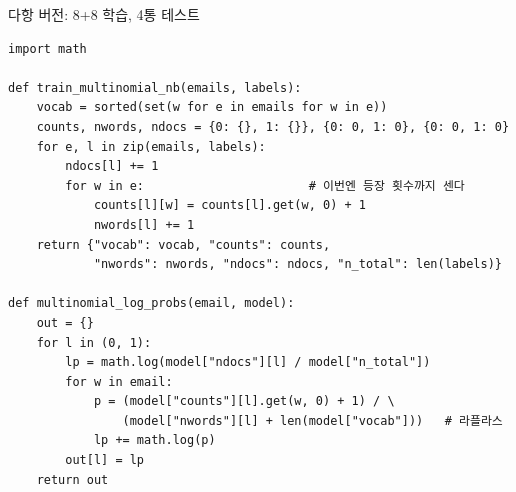 \begin{frame}[fragile,shrink=11]{다항 버전: 8+8 학습, 4통 테스트}
  \begin{lstlisting}
import math

def train_multinomial_nb(emails, labels):
    vocab = sorted(set(w for e in emails for w in e))
    counts, nwords, ndocs = {0: {}, 1: {}}, {0: 0, 1: 0}, {0: 0, 1: 0}
    for e, l in zip(emails, labels):
        ndocs[l] += 1
        for w in e:                       # 이번엔 등장 횟수까지 센다
            counts[l][w] = counts[l].get(w, 0) + 1
            nwords[l] += 1
    return {"vocab": vocab, "counts": counts,
            "nwords": nwords, "ndocs": ndocs, "n_total": len(labels)}

def multinomial_log_probs(email, model):
    out = {}
    for l in (0, 1):
        lp = math.log(model["ndocs"][l] / model["n_total"])
        for w in email:
            p = (model["counts"][l].get(w, 0) + 1) / \
                (model["nwords"][l] + len(model["vocab"]))   # 라플라스
            lp += math.log(p)
        out[l] = lp
    return out
  \end{lstlisting}
\end{frame}
